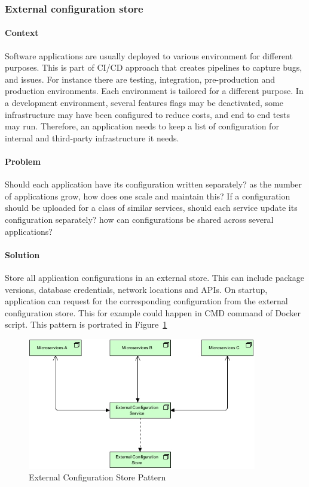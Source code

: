 \documentclass{bmcart}
\begin{document}
\subsubsection{External configuration store}

\paragraph{Context}

Software applications are usually deployed to various environment for different purposes. This is part of CI/CD approach that creates pipelines to capture bugs, and issues. For instance there are testing, integration, pre-production and production environments. Each environment is tailored for a different purpose. In a development environment, several features flags may be deactivated, some infrastructure may have been configured to reduce costs, and end to end tests may run. Therefore, an application needs to keep a list of configuration for internal and third-party infrastructure it needs. 

\paragraph{Problem}

Should each application have its configuration written separately? as the number of applications grow, how does one scale and maintain this? If a configuration should be uploaded for a class of similar services, should each service update its configuration separately? how can configurations be shared across several applications? 

\paragraph{Solution}

Store all application configurations in an external store. This can include package versions, database credentials, network locations and APIs. On startup, application can request for the corresponding configuration from the external configuration store. This for example could happen in CMD command of Docker script. This pattern is portrated in Figure~\ref{externalConfiguration}


\begin{figure}[h]
  \includegraphics[width=10cm]{Media/External Configuration Store.jpg}
  \caption{External Configuration Store Pattern}
  \label{externalConfiguration}
\end{figure}
\end{document}
